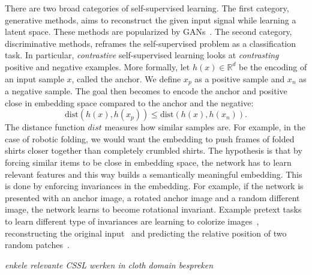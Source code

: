 \documentclass[\home/main.tex]{subfiles}
\begin{document}
There are two broad categories of self-supervised learning. The first category, generative methods, aims to reconstruct the given input signal while learning a latent space. These methods are popularized by GANs~\autocite{Goodfellow2014}. The second category, discriminative methods, reframes the self-supervised problem as a classification task. In particular, \emph{contrastive} self-supervised learning looks at \textit{contrasting} positive and negative examples. More formally, let $h(x) \in \mathbb{R}^d$ be the encoding of an input sample $x$, called the anchor. We define $x_p$ as a positive sample and $x_n$ as a negative sample. The goal then becomes to encode the anchor and positive close in embedding space compared to the anchor and the negative:
\begin{equation*}
	\text{dist}\left( h(x),h(x_p) \right) \leq \text{dist}\left( h(x),h(x_n) \right) .
\end{equation*}
The distance function $\textit{dist}$ measures how similar samples are. For example, in the case of robotic folding, we would want the embedding to push frames of folded shirts closer together than completely crumbled shirts. The hypothesis is that by forcing similar items to be close in embedding space, the network has to learn relevant features and this way builds a semantically meaningful embedding. This is done by enforcing invariances in the embedding. For example, if the network is presented with an anchor image, a rotated anchor image and a random different image, the network learns to become rotational invariant. Example pretext tasks to learn different type of invariances are learning to colorize images~\cite{Zhang2016Color}, reconstructing the original input~\cite{Pathak2016} and predicting the relative position of two random patches~\cite{Doersch2015}. 




\textit{enkele relevante CSSL werken in cloth domain bespreken}
\end{document}

